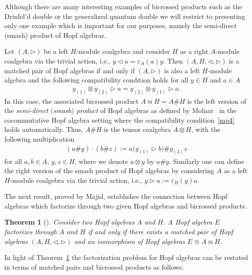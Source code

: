 \documentclass[pdftex]{sigma}
\numberwithin{equation}{section}
\newtheorem{Theorem}{Theorem}[section]
\begin{document}
Although there are many interesting examples of bicrossed products such as the Drinfel'd double \cite[Theorem~IX.3.5]{Kassel} or the generalized quantum double \cite[Example~7.2.6]{majid} we will restrict to presenting only one example which is important for our purposes, namely the semi-direct (smash) product of Hopf algebras.

\begin{Example} \label{exempleban}
Let $(A, \triangleright)$ be a left $H$-module coalgebra and consider $H$ as a right $A$-module coalgebra via the trivial action, i.e., $y \triangleleft a = \varepsilon_A(a) y$. Then $(A,H, \triangleleft, \triangleright)$ is a matched pair of Hopf algebras if and only if $(A, \triangleright)$ is also a left $H$-module algebra and the following compatibility condition holds for all $y \in H$ and $a\in A$
\begin{gather*}
y_{(1)} \otimes y_{(2)} \triangleright a = y_{(2)} \otimes y_{(1)} \triangleright a.
\end{gather*}
In this case, the associated bicrossed product $A\bowtie H = A\# H$ is the left version of the \emph{semi-direct $($smash$)$ product} of Hopf algebras as defined by Molnar~\cite{Mo} in the cocommutative Hopf algebra setting where the compatibility condition~\eqref{mp4} holds automatically. Thus, $A\# H$ is the tensor coalgebra $A\otimes H$, with the following multiplication
\begin{gather*}
(a \# y) \cdot (b \# z):= a \big(y_{(1)} \triangleright b \big) \# y_{(2)} z
\end{gather*}
for all $a, b\in A$, $y, z\in H$, where we denote $a\otimes y$ by $a\# y$. Similarly one can define the right version of the smash product of Hopf algebras by considering $A$ as a left $H$-module coalgebra via the trivial action, i.e., $y \triangleright a := \varepsilon_H(y) a$.
\end{Example}

The next result, proved by Majid, establishes the connection between Hopf algebras which factorize through two given Hopf algebras and bicrossed products.

\begin{Theorem}[{\cite[Theorem 7.2.3]{majid2}}]\label{carMaj}
Consider two Hopf algebras $A$ and $H$. A Hopf algebra $E$ factorizes through $A$ and $H$ if and only if there exists a matched pair of Hopf algebras $(A, H, \triangleleft, \triangleright)$ and an isomorphism of Hopf algebras $E \cong A \bowtie H$.
\end{Theorem}
In light of Theorem~\ref{carMaj} the factorization problem for Hopf
algebras can be restated in terms of matched pairs and bicrossed products as follows:
\end{document}
